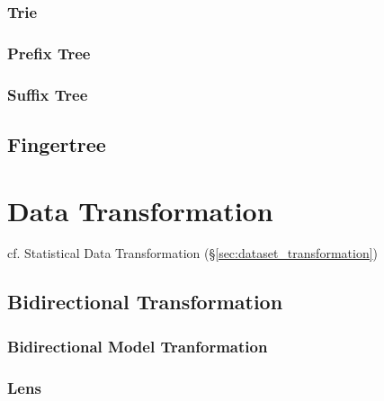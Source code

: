 \subsubsection{Trie}\label{sec:trie}

\subsubsection{Prefix Tree}\label{sec:prefix_tree}

\subsubsection{Suffix Tree}\label{sec:suffix_tree}



\subsection{Fingertree}\label{sec:fingertree}



\section{Data Transformation}\label{sec:data_transformation}

\fist cf. Statistical Data Transformation (\S\ref{sec:dataset_transformation})



\subsection{Bidirectional Transformation}
\label{sec:bidirectional_transformation}

\subsubsection{Bidirectional Model Tranformation}
\label{sec:bidirectional_model_transformation}

\subsubsection{Lens}\label{sec:lens}

